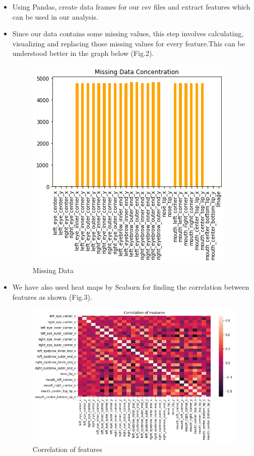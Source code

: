 \documentclass[conference]{IEEEtran}
\begin{document}
\begin{itemize}
    \item Using Pandas, create data frames for our csv files and extract features which can be used in our analysis. 
    
    \item Since our data contains some missing values, this step involves calculating, visualizing and replacing those missing values for every feature.This can be understood better in the graph below (Fig.2).
    
\begin{figure}[h!]
    \centering
    \includegraphics[scale=0.5]{missingData.png}
    \caption{Missing Data}
    \label{fig:my_label}
\end{figure}
    
    \item We have also used heat maps by Seaborn for finding the correlation between features as shown (Fig.3).

\begin{figure}[h!]
    \centering
    \includegraphics[scale=0.35]{correlationFeatures.png}
    \caption{Correlation of features}
    \label{fig:my_label}
\end{figure}
    

\end{itemize}
\end{document}
